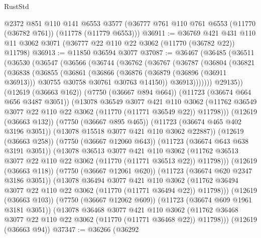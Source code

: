 \begin{lexlean}{RustStd}
\begin{coremodule}
    @2372
    @851
    @110
    @141
    @6553
    @3577
    (@36777 @761 @110 @761 @6553 (@11770 (@36782 @761)) (@11778 (@11779 @6553)))
@36911 := @36769
    @421
    @431
    @110
    @11
    @3062
    @3071
    (@36777 @22 @110 @22 @3062 (@11770 (@36782 @22)) @11798)
@36913 := @11850 @36594 @3077
@37087 := @36467
    (@36485
      (@36511
        (@36530
          (@36547
            (@36566
              (@36744
                (@36762
                  (@36767
                    (@36787
                      (@36804
                        (@36821
                          (@36838
                            (@36855
                              (@36861
                                (@36866
                                  (@36876
                                    (@36879 (@36896 (@36911 @36913)))
                                    @30755
                                    @30758
                                    @30761
                                    @30763
                                    @14150))
                                @36913)))))))
                  @29135))
              (@12619 (@36663 @162))
              (@7750 (@36667 @894 @664))
              (@11723 (@36674 @664 @656 @3487 @3051))
              (@13078
                @36549
                @3077
                @421
                @110
                @3062
                (@11762 @36549 @3077 @22 @110 @22 @3062 (@11770 (@11771 @36549 @22)) @11798)))
            (@12619 (@36663 @132))
            (@7750 (@36667 @895 @465))
            (@11723 (@36674 @465 @402 @3196 @3051))
            (@13078 @15518 @3077 @421 @110 @3062 @22887))
          (@12619 (@36663 @258))
          (@7750 (@36667 @12060 @643))
          (@11723 (@36674 @643 @638 @3191 @3051))
          (@13078
            @36513
            @3077
            @421
            @110
            @3062
            (@11762 @36513 @3077 @22 @110 @22 @3062 (@11770 (@11771 @36513 @22)) @11798)))
        (@12619 (@36663 @118))
        (@7750 (@36667 @12061 @620))
        (@11723 (@36674 @620 @2347 @3186 @3051))
        (@13078
          @36494
          @3077
          @421
          @110
          @3062
          (@11762 @36494 @3077 @22 @110 @22 @3062 (@11770 (@11771 @36494 @22)) @11798)))
      (@12619 (@36663 @103))
      (@7750 (@36667 @12062 @609))
      (@11723 (@36674 @609 @1961 @3181 @3051))
      (@13078
        @36468
        @3077
        @421
        @110
        @3062
        (@11762 @36468 @3077 @22 @110 @22 @3062 (@11770 (@11771 @36468 @22)) @11798)))
    (@12619 (@36663 @94))
@37347 := @36266
    (@36292

\end{coremodule}
\end{lexlean}
